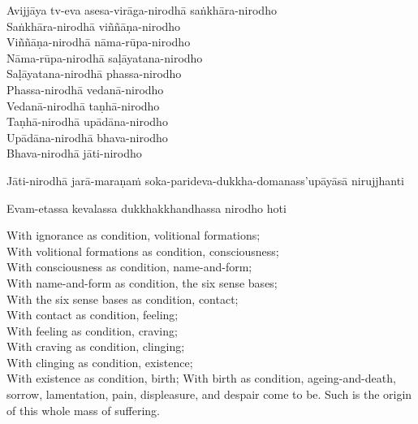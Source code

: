 \begin{pali-hang-continued}
Avijjāya tv-eva asesa-virāga-nirodhā saṅkhāra-nirodho\\
Saṅkhāra-nirodhā viññāṇa-nirodho\\
Viññāṇa-nirodhā nāma-rūpa-nirodho\\
Nāma-rūpa-nirodhā saḷāyatana-nirodho\\
Saḷāyatana-nirodhā phassa-nirodho\\
Phassa-nirodhā vedanā-nirodho\\
Vedanā-nirodhā taṇhā-nirodho\\
Taṇhā-nirodhā upādāna-nirodho\\
Upādāna-nirodhā bhava-nirodho\\
Bhava-nirodhā jāti-nirodho
\begin{pali-hangtogether}
Jāti-nirodhā jarā-maraṇaṁ soka-parideva-dukkha-domanass'upāyāsā nirujjhanti
\end{pali-hangtogether}
\begin{pali-hangtogether}
Evam-etassa kevalassa dukkhakkhandhassa nirodho hoti
\end{pali-hangtogether}
\end{pali-hang-continued}

\begin{english-hang-verses}
  With ignorance as condition, volitional formations;\\
  With volitional formations as condition, consciousness;\\
  With consciousness as condition, name-and-form;\\
  With name-and-form as condition, the six sense bases;\\
  With the six sense bases as condition, contact;\\
  With contact as condition, feeling;\\
  With feeling as condition, craving;\\
  With craving as condition, clinging;\\
  With clinging as condition, existence;\\
  With existence as condition, birth;
  With birth as condition, ageing-and-death, sorrow, lamentation, pain, displeasure, and despair come to be.
  Such is the origin of this whole mass of suffering.
\end{english-hang-verses}

